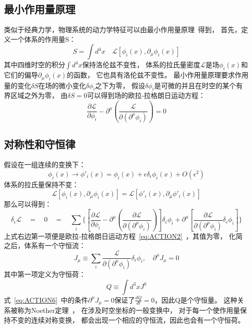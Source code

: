 \subsection{最小作用量原理}
\label{sec:LAP}
类似于经典力学，物理系统的动力学特征可以由最小作用量原理~\cite{ACTION1,ACTION2}得到，
首先，定义一个体系的作用量S：
\begin{equation} 
\label{eq:ACTION1}
S=\int d^4x \quad \mathcal{L}\left[ \phi_i(x),\partial_{\mu}\phi_i(x) \right]
\end{equation}
其中四维时空的积分$\int d^4x$保持洛伦兹不变性，
体系的拉氏量密度$\mathcal{L}$是场$\phi_i(x)$和它们的偏导$\partial_{\mu}\phi_i(x)$的函数，
它也具有洛伦兹不变性。
最小作用量原理要求作用量的变化$\delta S$在场的微小变化$\delta \phi_i$之下为零，
假设$\delta \phi_i$是可微的并且在时空的某个有界区域之外为零，
由$\delta S=0$可以得到场的欧拉-拉格朗日运动方程：
\begin{equation} 
\label{eq:ACTION2}
\frac{\partial\mathcal{L}}{\partial\phi_i}-\partial^{\mu}\left( \frac{\mathcal{L}}{\partial(\partial^{\mu}\phi_i)} \right) =0
\end{equation}

\subsection{对称性和守恒律}
\label{sec:SCL}
假设在一组连续的变换下：
\begin{equation} 
\label{eq:ACTION3}
\phi_i(x) \rightarrow \phi'_i(x)=\phi_i(x)+\epsilon\delta_{\epsilon}\phi_i(x)+O(\epsilon^2)
\end{equation}
体系的拉氏量保持不变：
\begin{equation} 
\label{eq:ACTION4}
\mathcal{L}\left[ \phi_i(x),\partial_{\mu}\phi_i(x) \right]=\mathcal{L}\left[ \phi'_i(x),\partial_{\mu}\phi'_i(x) \right]
\end{equation}
那么可以得到：
\begin{equation} 
\label{eq:ACTION5}
\delta_{\epsilon}\mathcal{L} \quad = \quad 0 \quad = \quad \sum_i \Bigg\{ \left[ \frac{\partial\mathcal{L}}{\partial\phi_i}-\partial^{\mu}\left( \frac{\partial\mathcal{L}}{\partial(\partial^{\mu}\phi_i)} \right) \right] \delta_{\epsilon}\phi_i + \partial^{\mu}  \left[  \frac{\partial\mathcal{L}}{\partial(\partial^{\mu}\phi_i)}\delta_{\epsilon}\phi_i  \right]   \Bigg\}
\end{equation}
上式右边第一项便是欧拉-拉格朗日运动方程~\ref{eq:ACTION2}~，其值为零，
化简之后，体系有一个守恒流：
\begin{equation} 
\label{eq:ACTION6}
J_{\mu}\equiv\sum_i \frac{\mathcal{L}}{\partial(\partial^{\mu}\phi_i)}\delta_{\epsilon}\phi_i , \quad \partial^{\mu}J_{\mu}=0
\end{equation}
其中第一项定义为守恒荷：
\begin{equation} 
\label{eq:ACTION7}
Q \equiv \int d^3x J^0
\end{equation}
式~\ref{eq:ACTION6}~中的条件$\partial^{\mu}J_{\mu}=0$保证了$\frac{dQ}{dt}=0$，因此Q是个守恒量。
这种关系被称为Noether定理~\cite{NOETHER}，
在涉及时空坐标的一般变换中，
对于每一个使作用量保持不变的连续对称变换，
都会出现一个相应的守恒流，因此也会有一个守恒荷。

